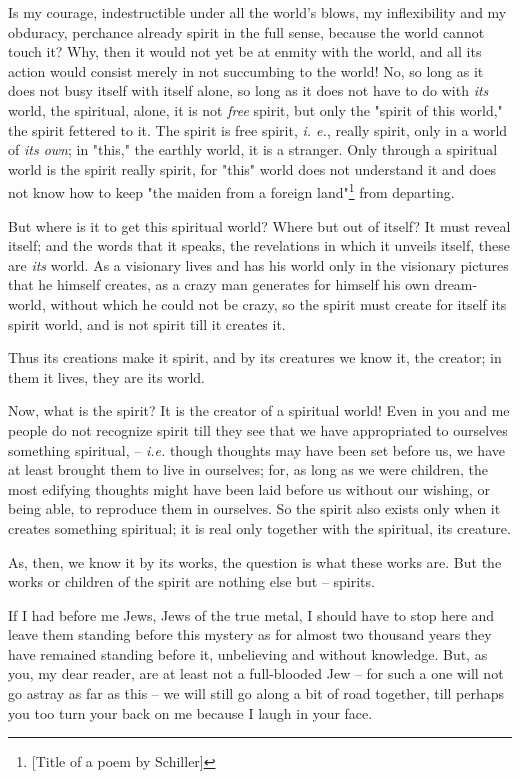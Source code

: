 \documentclass[a4paper]{book}
\begin{document}
Is my courage, indestructible under all the world's blows, my inflexibility 
and my obduracy, perchance already spirit in the full sense, because the world 
cannot touch it? Why, then it would not yet be at enmity with the world, and 
all its action would consist merely in not succumbing to the world! No, so 
long as it does not busy itself with itself alone, so long as it does not have 
to do with \textit{its} world, the spiritual, alone, it is not \textit{free} 
spirit, but only the "{}spirit of this world,"{} the spirit fettered to it. 
The spirit is free spirit, \textit{i. e.}, really spirit, only in a world of 
\textit{its own}; in "{}this,"{} the earthly world, it is a stranger. Only 
through a spiritual world is the spirit really spirit, for "{}this"{} world 
does not understand it and does not know how to keep "{}the maiden from a 
foreign land"{}\footnote{[Title of a poem by Schiller]} from departing.

But where is it to get this spiritual world? Where but out of itself? It must 
reveal itself; and the words that it speaks, the revelations in which it 
unveils itself, these are \textit{its} world. As a visionary lives and has his 
world only in the visionary pictures that he himself creates, as a crazy man 
generates for himself his own dream-world, without which he could not be 
crazy, so the spirit must create for itself its spirit world, and is not 
spirit till it creates it.

Thus its creations make it spirit, and by its creatures we know it, the 
creator; in them it lives, they are its world.

Now, what is the spirit? It is the creator of a spiritual world! Even in you 
and me people do not recognize spirit till they see that we have appropriated 
to ourselves something spiritual, -- \textit{i.e.} though thoughts may have 
been set before us, we have at least brought them to live in ourselves; for, 
as long as we were children, the most edifying thoughts might have been laid 
before us without our wishing, or being able, to reproduce them in ourselves. 
So the spirit also exists only when it creates something spiritual; it is real 
only together with the spiritual, its creature.

As, then, we know it by its works, the question is what these works are. But 
the works or children of the spirit are nothing else but -- spirits.

If I had before me Jews, Jews of the true metal, I should have to stop here 
and leave them standing before this mystery as for almost two thousand years 
they have remained standing before it, unbelieving and without knowledge. But, 
as you, my dear reader, are at least not a full-blooded Jew -- for such a one 
will not go astray as far as this -- we will still go along a bit of road 
together, till perhaps you too turn your back on me because I laugh in your 
face.
\end{document}
